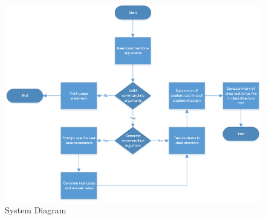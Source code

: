 \begin{figure}[tbh]
\begin{center}
\includegraphics[width=1\textwidth]{./SystemDiagram}
\end{center}
\caption{System Diagram \label{systemdiagram}}
\end{figure}




